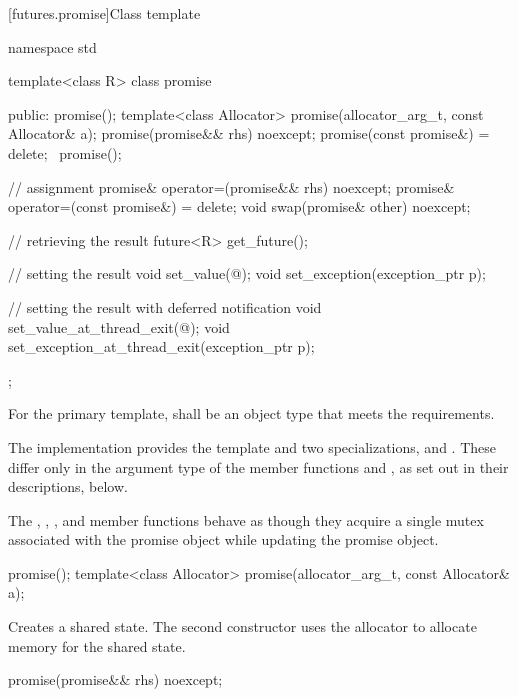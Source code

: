[futures.promise]{Class template }

%
\begin{codeblock}
namespace std {
  template<class R>
  class promise {
  public:
    promise();
    template<class Allocator>
      promise(allocator_arg_t, const Allocator& a);
    promise(promise&& rhs) noexcept;
    promise(const promise&) = delete;
    ~promise();

    // assignment
    promise& operator=(promise&& rhs) noexcept;
    promise& operator=(const promise&) = delete;
    void swap(promise& other) noexcept;

    // retrieving the result
    future<R> get_future();

    // setting the result
    void set_value(@\seebelow@);
    void set_exception(exception_ptr p);

    // setting the result with deferred notification
    void set_value_at_thread_exit(@\seebelow@);
    void set_exception_at_thread_exit(exception_ptr p);
  };
}
\end{codeblock}

\pnum
For the primary template,  shall be an object type that
meets the  requirements.

\pnum
The implementation provides the template  and two specializations,
 and . These differ only in the argument type
of the member functions  and ,
as set out in their descriptions, below.

\pnum
The , , ,
and  member functions behave as though
they acquire a single mutex associated with the promise object while updating the
promise object.

%
\begin{itemdecl}
promise();
template<class Allocator>
  promise(allocator_arg_t, const Allocator& a);
\end{itemdecl}

\begin{itemdescr}
\pnum
\effects
Creates a shared state. The second
constructor uses the allocator  to allocate memory for the shared
state.
\end{itemdescr}

%
\begin{itemdecl}
promise(promise&& rhs) noexcept;
\end{itemdecl}

